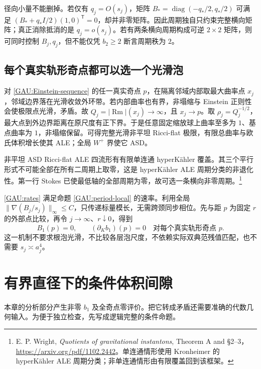 \documentclass[UTF8,fontset=fandol,zihao=-4,oneside,openany]{ctexbook}
\theoremstyle{cjkplain}
\numberwithin{equation}{chapter}
\begin{document}
径向小量不能删掉。若仅有 $q_j=O(s_j)$，矩阵
$B_*=\operatorname{diag}(-q_*/2,q_*/2)$ 可满足
$(B_*+q_*I/2)(1,0)^{\mathsf T}=0$，却并非零矩阵。因此周期独自只约束完整横向矩阵；真正消除抵消的是 $q_j=o(s_j)$。若有两条横向周期构成可逆 $2\times2$ 矩阵，则可同时控制 $B_j,q_j$，但不能仅凭 $b_2\ge2$ 断言周期秩为 $2$。

\subsection{每个真实轨形奇点都可以选一个光滑泡}
对 \eqref{GAU:Einstein-sequence} 的任一真实奇点 $p$，在隔离邻域内部取最大曲率点 $x_j$，邻域边界落在光滑收敛外环带。若内部曲率也有界，非塌缩与 Einstein 正则性会使极限点光滑，矛盾。故 $Q_j=|\operatorname{Rm}|(x_j)\to\infty$，且 $x_j\to p$。取 $\rho_j=Q_j^{-1/2}$，最大点到外边界距离在原尺度有正下界。于是任意固定缩放球上曲率至多为 $1$、基点曲率为 $1$，非塌缩保留。可得完整光滑非平坦 Ricci-flat 极限，有限总曲率与欧氏体积增长使其 ALE；全局 $W^+$ 界使它 ASD。

非平坦 ASD Ricci-flat ALE 四流形有有限单连通 hyperKähler 覆盖。其三个平行形式不可能全部在所有二周期上取零，这是 hyperKähler ALE 周期分类的非退化性。第一行 Stokes 已使最低轴的全部周期为零，故可选一条横向非零周期。\footnote{E. P. Wright, \emph{Quotients of gravitational instantons}, Theorem A and §2--3，\url{https://arxiv.org/pdf/1102.2442}。单连通情形使用 Kronheimer 的 hyperKähler ALE 周期分类；非单连通情形由有限覆盖回到该框架。}

\eqref{GAU:rates} 满足命题 \ref{GAU:period-local} 的速率。利用全局
$\|\nabla(B_j/s_j)\|_\infty\le C$，只传递标量模长，无需跨颈同步相位。先与距 $p$ 为固定 $r$ 的外部点比较，再令 $j\to\infty$、$r\downarrow0$，得到
\begin{equation}\label{GAU:all-point-zero}
B_1(p)=0,\qquad(\partial_Kb_1)(p)=0
\quad\text{对每个真实轨形奇点 }p.
\end{equation}
这一机制不要求根泡光滑，不比较各层泡尺度，不依赖实际双典范残值匹配，也不需要 $s_j\asymp a_j^4$。

\section{有界直径下的条件体积间隙}
\label{GAU:gap}

本章的分析部分产生非零 $b_1$ 及全奇点零评价。把它转成矛盾还需要准确的代数几何输入。为便于独立检查，先写成逻辑完整的条件命题。
\end{document}

